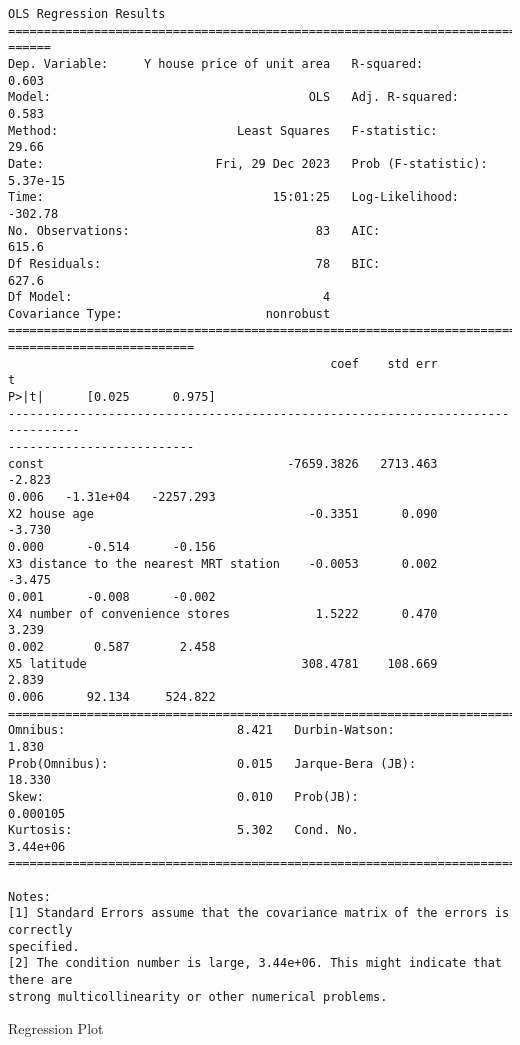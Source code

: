\documentclass[11pt]{article}
\begin{document}
    \begin{Verbatim}[commandchars=\\\{\}]
                                OLS Regression Results
================================================================================
======
Dep. Variable:     Y house price of unit area   R-squared:
0.603
Model:                                    OLS   Adj. R-squared:
0.583
Method:                         Least Squares   F-statistic:
29.66
Date:                        Fri, 29 Dec 2023   Prob (F-statistic):
5.37e-15
Time:                                15:01:25   Log-Likelihood:
-302.78
No. Observations:                          83   AIC:
615.6
Df Residuals:                              78   BIC:
627.6
Df Model:                                   4
Covariance Type:                    nonrobust
================================================================================
==========================
                                             coef    std err          t
P>|t|      [0.025      0.975]
--------------------------------------------------------------------------------
--------------------------
const                                  -7659.3826   2713.463     -2.823
0.006   -1.31e+04   -2257.293
X2 house age                              -0.3351      0.090     -3.730
0.000      -0.514      -0.156
X3 distance to the nearest MRT station    -0.0053      0.002     -3.475
0.001      -0.008      -0.002
X4 number of convenience stores            1.5222      0.470      3.239
0.002       0.587       2.458
X5 latitude                              308.4781    108.669      2.839
0.006      92.134     524.822
==============================================================================
Omnibus:                        8.421   Durbin-Watson:                   1.830
Prob(Omnibus):                  0.015   Jarque-Bera (JB):               18.330
Skew:                           0.010   Prob(JB):                     0.000105
Kurtosis:                       5.302   Cond. No.                     3.44e+06
==============================================================================

Notes:
[1] Standard Errors assume that the covariance matrix of the errors is correctly
specified.
[2] The condition number is large, 3.44e+06. This might indicate that there are
strong multicollinearity or other numerical problems.
    \end{Verbatim}

    Regression Plot
\end{document}
